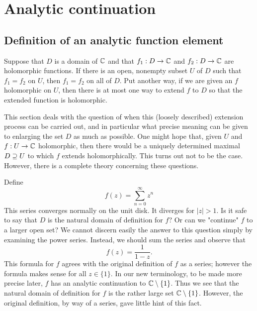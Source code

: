 \section{Analytic continuation}
\subsection{Definition of an analytic function element}
Suppose that $D$ is a domain of $\mathbb{C}$ and that $f_1:D\to\mathbb{C}$ and $f_2:D\to\mathbb{C}$ are holomorphic functions. If there is an open, nonempty subset $U$ of $D$ such that $f_1=f_2$ on $U$, then $f_1=f_2$ on all of $D$. Put another way, if we are given an $f$ holomorphic on $U$, then there is at most one way to extend $f$ to $D$ so that the extended function is holomorphic.\par
This section deals with the question of when this (loosely described) extension process can be carried out, and in particular what precise meaning can be given to enlarging the set $D$ as much as possible. One might hope that, given $U$ and $f:U\to\mathbb{C}$ holomorphic, then there would be a uniquely determined maximal $D\supseteq U$ to which $f$ extends holomorphically. This turns out not to be the case. However, there is a complete theory concerning these questions.
\begin{example}
Define
\[f(z)=\sum_{n=0}^{\infty}z^n\]
This series converges normally on the unit disk. It diverges for $|z|>1$. Is it safe to say that $D$ is the natural domain of definition for $f$? Or can we "continue" $f$ to a larger open set? We cannot discern easily the answer to this question simply by examining the power series. Instead, we should sum the series and observe that
\[f(z)=\frac{1}{1-z}.\]
This formula for $f$ agrees with the original definition of $f$ as a series; however the formula makes sense for all $z\in\{1\}$. In our new terminology, to be made more precise later, $f$ has an analytic continuation to $\mathbb{C}\setminus\{1\}$. Thus we see that the natural domain of definition for $f$ is the rather large set $\mathbb{C}\setminus\{1\}$. However, the original definition, by way of a series, gave little hint of this fact.
\end{example}
